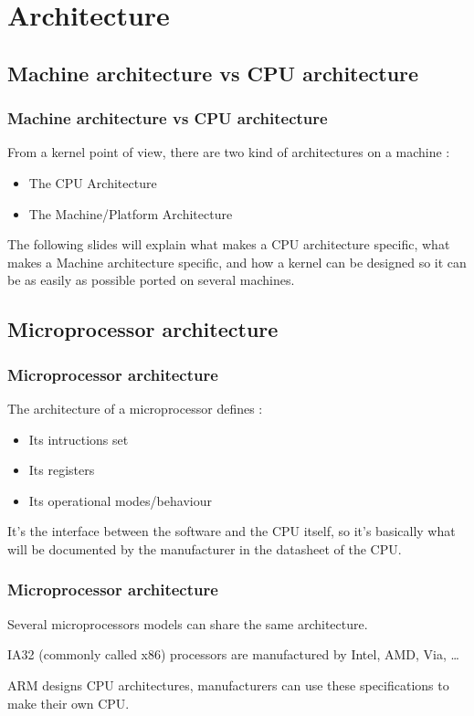 \section{Architecture}
\subsection{Machine architecture vs CPU architecture}

\begin{frame}
  \frametitle{Machine architecture vs CPU architecture}

  From a kernel point of view, there are two kind of architectures on a machine :

  \begin{itemize}
  \item The CPU Architecture
  \item The Machine/Platform Architecture
  \end{itemize}

  \-

  The following slides will explain what makes a CPU architecture specific, what makes a Machine architecture specific, and how a kernel can be designed so it can be as easily as possible ported on several machines.  

\end{frame}

\subsection{Microprocessor architecture}

\begin{frame}
  \frametitle{Microprocessor architecture}

  The architecture of a microprocessor defines :

  \begin{itemize}
  \item Its intructions set
  \item Its registers
  \item Its operational modes/behaviour
  \end{itemize}

  \-

  It's the interface between the software and the CPU itself, so it's basically what will be documented by the manufacturer in the datasheet of the CPU.

\end{frame}

\begin{frame}
  \frametitle{Microprocessor architecture}
  
  Several microprocessors models can share the same architecture.

  \-

  IA32 (commonly called x86) processors are manufactured by Intel, AMD, Via, \ldots

  \-

  ARM designs CPU architectures, manufacturers can use these specifications to make their own CPU.

\end{frame}

